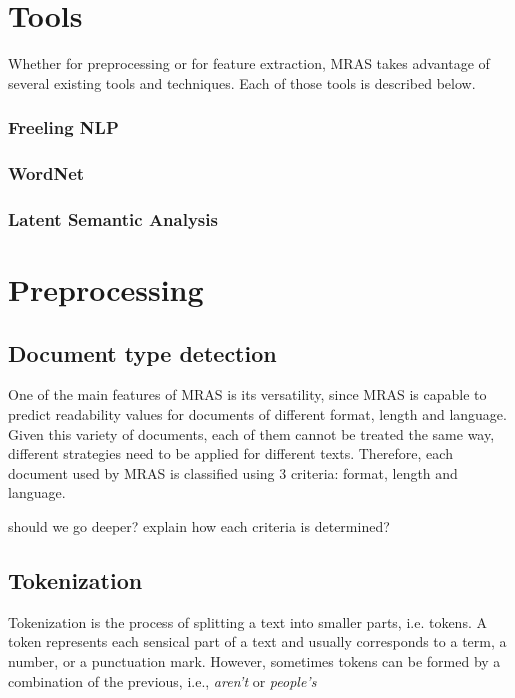 \documentclass{bsu-ms}
\newcommand{\projectName}{ MRAS }
\begin{document}
\section{Tools}
\label{sec:tools}

Whether for preprocessing or for feature extraction, \projectName takes advantage of several existing tools and techniques. Each of those tools is described below.

\subsubsection*{Freeling NLP}
\subsubsection*{WordNet}
\subsubsection*{Latent Semantic Analysis}



\section{Preprocessing}
\label{sec:preprocessing}


\subsection{Document type detection}
One of the main features of \projectName is its versatility, since \projectName is capable to predict readability values for documents of different format, length and language. Given this variety of documents, each of them cannot be treated the same way, different strategies need to be applied for different texts. Therefore, each document used by \projectName is classified using 3 criteria: format, length and language.


{\color{red} should we go deeper? explain how each criteria is determined?}


\subsection{Tokenization}
Tokenization is the process of splitting a text into smaller parts, i.e. tokens. A token represents each sensical part of a text and usually corresponds to a term, a number, or a punctuation mark. However, sometimes tokens can be formed by a combination of the previous, i.e., \emph{aren't} or \emph{people's}
\end{document}
